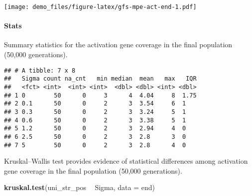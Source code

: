 \documentclass[]{book}
\newenvironment{Shaded}{\begin{snugshade}}{\end{snugshade}}
\newcommand{\DataTypeTok}[1]{\textcolor[rgb]{0.13,0.29,0.53}{#1}}
\newcommand{\KeywordTok}[1]{\textcolor[rgb]{0.13,0.29,0.53}{\textbf{#1}}}
\newcommand{\NormalTok}[1]{#1}
\newcommand{\OperatorTok}[1]{\textcolor[rgb]{0.81,0.36,0.00}{\textbf{#1}}}
\newcommand{\OtherTok}[1]{\textcolor[rgb]{0.56,0.35,0.01}{#1}}
\newcommand{\StringTok}[1]{\textcolor[rgb]{0.31,0.60,0.02}{#1}}
\let\oldparagraph\paragraph
\renewcommand{\paragraph}[1]{\oldparagraph{#1}\mbox{}}
\begin{document}
\texttt{[image: demo\_files/figure-latex/gfs-mpe-act-end-1.pdf]}

\hypertarget{stats-48}{%
\paragraph{Stats}\label{stats-48}}

Summary statistics for the activation gene coverage in the final population (50,000 generations).

\begin{Shaded}
\end{Shaded}

\begin{verbatim}
## # A tibble: 7 x 8
##   Sigma count na_cnt   min median  mean   max   IQR
##   <fct> <int>  <int> <int>  <dbl> <dbl> <int> <dbl>
## 1 0        50      0     3      4  4.04     8  1.75
## 2 0.1      50      0     2      3  3.54     6  1   
## 3 0.3      50      0     2      3  3.24     5  1   
## 4 0.6      50      0     2      3  3.38     5  1   
## 5 1.2      50      0     2      3  2.94     4  0   
## 6 2.5      50      0     2      3  2.8      3  0   
## 7 5        50      0     2      3  2.8      4  0
\end{verbatim}

Kruskal--Wallis test provides evidence of statistical differences among activation gene coverage in the final population (50,000 generations).

\begin{Shaded}
\begin{Highlighting}[]
\KeywordTok{kruskal.test}\NormalTok{(uni_str_pos }\OperatorTok{~}\StringTok{ }\NormalTok{Sigma, }\DataTypeTok{data =}\NormalTok{ end)}
\end{Highlighting}
\end{Shaded}
\end{document}
